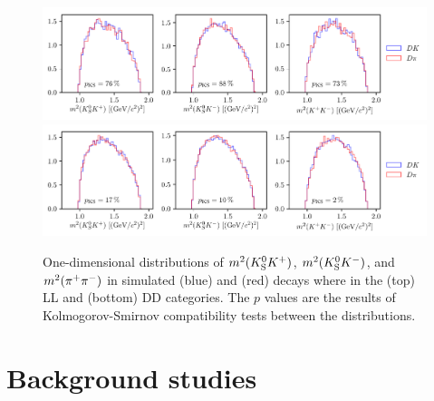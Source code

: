 \begin{figure}[tbp]
    \centering
    \includegraphics[width=\columnwidth]{figures/analysis/DP_thesis_s_KolSmi_KK_LL.pdf}
    \includegraphics[width=\columnwidth]{figures/analysis/DP_thesis_s_KolSmi_KK_DD.pdf}
    \caption{One-dimensional distributions of $m^2({{K}^0_{\mathrm{S}}}{{K}^+})$, $m^2({{K}^0_{\mathrm{S}}}{{K}^-})$, and $m^2({{\pi}^+}{{\pi}^-})$ in simulated (blue) \BtoDK and (red) \BtoDpi  decays where \DtoKsKK  in the (top) LL and (bottom) DD categories. The $p$ values are the results of Kolmogorov-Smirnov compatibility tests between the distributions.}
    \label{fig:KolSmi_KK}
\end{figure}



\section{Background studies} %
\label{sec:background_studies}

